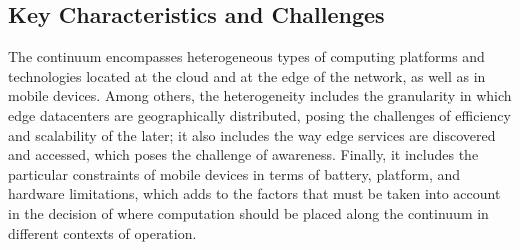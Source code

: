 \subsection{Key Characteristics and Challenges}


The continuum encompasses heterogeneous types of computing platforms and technologies located at the cloud and at the edge of the network, as well as in mobile devices. Among others, the heterogeneity includes the granularity in which edge datacenters are geographically distributed, posing the challenges of efficiency and scalability of the later; it also includes the way edge services are discovered and accessed, which poses the challenge of awareness. Finally, it includes the particular constraints of mobile devices in terms of battery, platform, and hardware limitations, which adds to the factors that must be taken into account in the decision of where computation should be placed along the continuum in different contexts of operation.








